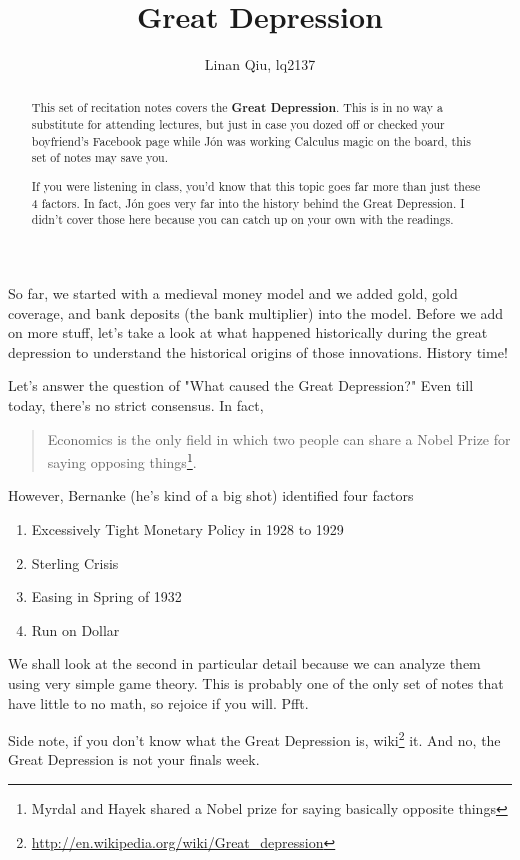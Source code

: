 \documentclass[11pt]{scrartcl}
\title{Great Depression}
\author{Linan Qiu, lq2137}
\newcommand{\jon}{J\'{o}n }
\begin{document}
\maketitle

\begin{abstract}
This set of recitation notes covers the \textbf{Great Depression}. This is in no way a substitute for attending lectures, but just in case you dozed off or checked your boyfriend's Facebook page while \jon was working Calculus magic on the board, this set of notes may save you.

If you were listening in class, you'd know that this topic goes far more than just these 4 factors. In fact, \jon goes very far into the history behind the Great Depression. I didn't cover those here because you can catch up on your own with the readings.
\end{abstract}

So far, we started with a medieval money model and we added gold, gold coverage, and bank deposits (the bank multiplier) into the model. Before we add on more stuff, let's take a look at what happened historically during the great depression to understand the historical origins of those innovations. History time!

Let's answer the question of "What caused the Great Depression?" Even till today, there's no strict consensus. In fact, 

\begin{quote}
Economics is the only field in which two people can share a Nobel Prize for saying opposing things\footnote{Myrdal and Hayek shared a Nobel prize for saying basically opposite things}.
\end{quote}

However, Bernanke (he's kind of a big shot) identified four factors

\begin{enumerate}
\item Excessively Tight Monetary Policy in 1928 to 1929
\item Sterling Crisis
\item Easing in Spring of 1932
\item Run on Dollar
\end{enumerate}

We shall look at the second in particular detail because we can analyze them using very simple game theory. This is probably one of the only set of notes that have little to no math, so rejoice if you will. Pfft.

Side note, if you don't know what the Great Depression is, wiki\footnote{\url{http://en.wikipedia.org/wiki/Great_depression}} it. And no, the Great Depression is not your finals week.
\end{document}

